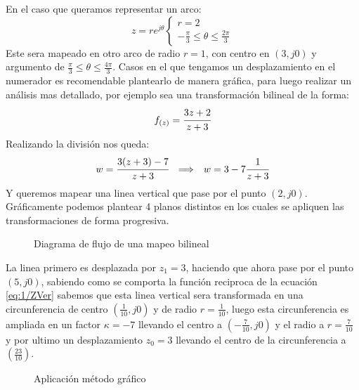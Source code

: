 En el caso que queramos representar un arco:
\begin{equation}
    z=re^{j\theta}\begin{cases}
        r=2\\
        -\frac{\pi}{3}\leq\theta\leq\frac{2\pi}{3}
    \end{cases}
\end{equation}
Este sera mapeado en otro arco de radio $r=1$, con centro en $(3,j0)$ y argumento de $\frac{\pi}{3}\leq\theta\leq\frac{4\pi}{3}$.
Casos en el que tengamos un desplazamiento en el numerador es recomendable plantearlo de manera gráfica, para luego realizar un análisis mas detallado,  por ejemplo sea una transformación bilineal de la forma:
\begin{equation}
    f_{(z)}=\cfrac{3z+2}{z+3}
\end{equation}
Realizando la división nos queda:
\begin{equation}
    w=\cfrac{3(z+3)-7}{z+3}\hspace{0.25cm} \Longrightarrow \hspace{0.25cm} w=3-7\cfrac{1}{z+3}
\end{equation}
Y queremos mapear una linea vertical que pase por el punto $(2,j0)$. Gráficamente podemos plantear 4 planos distintos en los cuales se apliquen las transformaciones de forma progresiva.
\begin{figure}[H]
    \centering
    
    \caption{Diagrama de flujo de una mapeo bilineal}
    \label{fig:DiagBil}
\end{figure}
La linea primero es desplazada por $z_1=3$, haciendo que ahora pase por el punto $(5,j0)$, sabiendo como se comporta la función reciproca de la ecuación \ref{eq:1/ZVer} sabemos que esta linea vertical sera transformada en una circunferencia de centro $(\frac{1}{10},j0)$ y de radio $r=\frac{1}{10}$, luego esta circunferencia es ampliada en un factor $\kappa=-7$ llevando el centro a $(-\frac{7}{10},j0)$  y el radio a $r=\frac{7}{10}$ y por ultimo un desplazamiento $z_0=3$ llevando el centro de la circunferencia a $(\frac{23}{10})$.
\begin{figure}[H]
    \centering
    \begin{minipage}{0.49\textwidth}
        \centering
        
    \end{minipage}
    \begin{minipage}{0.49\textwidth}
        \centering
        
    \end{minipage}
    \begin{minipage}{0.49\textwidth}
        \centering
        
    \end{minipage}
    \begin{minipage}{0.49\textwidth}
        \centering
        
    \end{minipage}
    \caption{Aplicación método gráfico}
    \label{fig:TransBil}
\end{figure}

